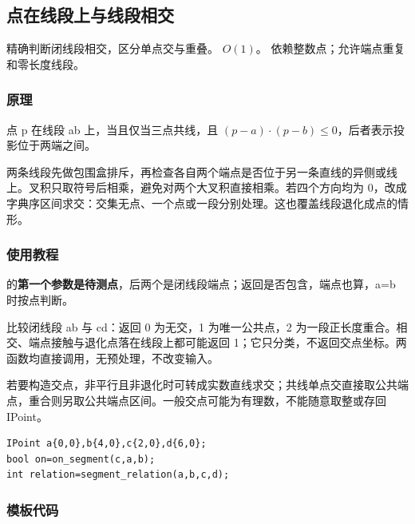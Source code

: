 \subsection{点在线段上与线段相交}
\label{geo:segment}
\AlgorithmInfo
    {精确判断闭线段相交，区分单点交与重叠。}
    {$O(1)$。}
    {依赖整数点；允许端点重复和零长度线段。}
\subsubsection*{原理}

点 p 在线段 ab 上，当且仅当三点共线，且 $(p-a)\cdot(p-b)\le0$，后者表示投影位于两端之间。

两条线段先做包围盒排斥，再检查各自两个端点是否位于另一条直线的异侧或线上。叉积只取符号后相乘，避免对两个大叉积直接相乘。若四个方向均为 0，改成字典序区间求交：交集无点、一个点或一段分别处理。这也覆盖线段退化成点的情形。

\subsubsection*{使用教程}
 的\textbf{第一个参数是待测点}，后两个是闭线段端点；返回是否包含，端点也算，a=b 时按点判断。

 比较闭线段 ab 与 cd：返回 0 为无交，1 为唯一公共点，2 为一段正长度重合。相交、端点接触与退化点落在线段上都可能返回 1；它只分类，不返回交点坐标。两函数均直接调用，无预处理，不改变输入。

若要构造交点，非平行且非退化时可转成实数直线求交；共线单点交直接取公共端点，重合则另取公共端点区间。一般交点可能为有理数，不能随意取整或存回 IPoint。
\begin{lstlisting}[style=mtycpp,numbers=none]
IPoint a{0,0},b{4,0},c{2,0},d{6,0};
bool on=on_segment(c,a,b);
int relation=segment_relation(a,b,c,d);
\end{lstlisting}
\subsubsection*{模板代码}
